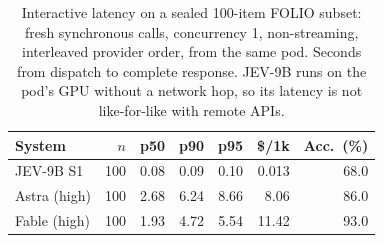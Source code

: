 \begin{table}[t]
\centering\small
\caption{Interactive latency on a sealed 100-item FOLIO subset: fresh synchronous calls, concurrency 1, non-streaming, interleaved provider order, from the same pod. Seconds from dispatch to complete response. JEV-9B runs on the pod's GPU without a network hop, so its latency is not like-for-like with remote APIs.}
\label{tab:latency}
\begin{tabular}{@{}lrrrrrr@{}}
\toprule
System & $n$ & p50 & p90 & p95 & \$/1k & Acc.\ (\%) \\
\midrule
JEV-9B S1 & 100 & 0.08 & 0.09 & 0.10 & 0.013 & 68.0 \\
Astra (high) & 100 & 2.68 & 6.24 & 8.66 & 8.06 & 86.0 \\
Fable (high) & 100 & 1.93 & 4.72 & 5.54 & 11.42 & 93.0 \\
\bottomrule
\end{tabular}
\end{table}

